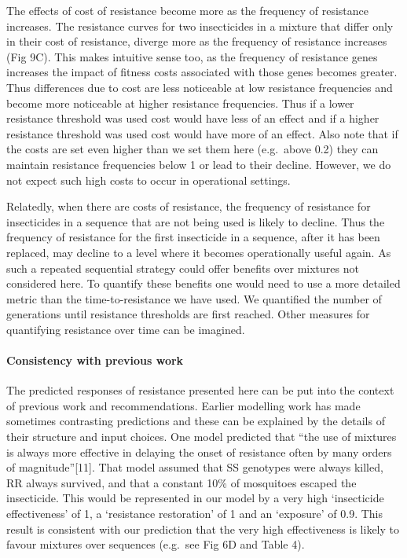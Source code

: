 \documentclass[11pt,]{article}
\let\oldparagraph\paragraph
\renewcommand{\paragraph}[1]{\oldparagraph{#1}\mbox{}}
\begin{document}
The effects of cost of resistance become more as the frequency of
resistance increases. The resistance curves for two insecticides in a
mixture that differ only in their cost of resistance, diverge more as
the frequency of resistance increases (Fig 9C). This makes intuitive
sense too, as the frequency of resistance genes increases the impact of
fitness costs associated with those genes becomes greater. Thus
differences due to cost are less noticeable at low resistance
frequencies and become more noticeable at higher resistance frequencies.
Thus if a lower resistance threshold was used cost would have less of an
effect and if a higher resistance threshold was used cost would have
more of an effect. Also note that if the costs are set even higher than
we set them here (e.g.~above 0.2) they can maintain resistance
frequencies below 1 or lead to their decline. However, we do not expect
such high costs to occur in operational settings.

Relatedly, when there are costs of resistance, the frequency of
resistance for insecticides in a sequence that are not being used is
likely to decline. Thus the frequency of resistance for the first
insecticide in a sequence, after it has been replaced, may decline to a
level where it becomes operationally useful again. As such a repeated
sequential strategy could offer benefits over mixtures not considered
here. To quantify these benefits one would need to use a more detailed
metric than the time-to-resistance we have used. We quantified the
number of generations until resistance thresholds are first reached.
Other measures for quantifying resistance over time can be imagined.

\paragraph{Consistency with previous
work}\label{consistency-with-previous-work}

The predicted responses of resistance presented here can be put into the
context of previous work and recommendations. Earlier modelling work has
made sometimes contrasting predictions and these can be explained by the
details of their structure and input choices. One model predicted that
``the use of mixtures is always more effective in delaying the onset of
resistance often by many orders of magnitude''{[}11{]}. That model
assumed that SS genotypes were always killed, RR always survived, and
that a constant 10\% of mosquitoes escaped the insecticide. This would
be represented in our model by a very high `insecticide effectiveness'
of 1, a `resistance restoration' of 1 and an `exposure' of 0.9. This
result is consistent with our prediction that the very high
effectiveness is likely to favour mixtures over sequences (e.g.~see Fig
6D and Table 4).
\end{document}
